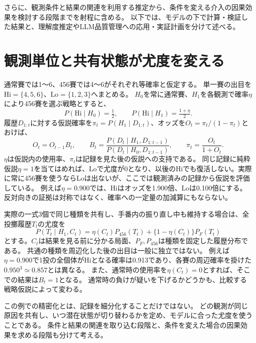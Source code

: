 \documentclass[10pt,a4paper]{article}
\newcommand{\given}{\mid}
\newcommand{\Hi}{\mathrm{Hi}}
\newcommand{\Lo}{\mathrm{Lo}}
\begin{document}
さらに、観測条件と結果の関連を利用する推定から、条件を変える介入の因果効果を検討する段階までを射程に含める。
以下では、モデルの下で計算・検証した結果と、理解度推定やLLM品質管理への応用・実証計画を分けて述べる。

\section{観測単位と共有状態が尤度を変える}
通常賽では1〜6、456賽では4〜6がそれぞれ等確率と仮定する。
単一賽の出目を$\Hi=\{4,5,6\}$、$\Lo=\{1,2,3\}$へまとめる。
$H_0$を常に通常賽、$H_1$を各観測で確率$\eta$により456賽を選ぶ戦略とすると、
\begin{equation}
 P(\Hi\given H_0)=\tfrac12,\qquad
 P(\Hi\given H_1)=\tfrac{1+\eta}{2}.
\end{equation}
履歴$D_{1:t}$に対する仮説確率を$\pi_t=P(H_1\given D_{1:t})$、オッズを$O_t=\pi_t/(1-\pi_t)$とおけば、
\begin{equation}
 O_t=O_{t-1}B_t,\qquad
 B_t=\frac{P(D_t\given H_1,D_{1:t-1})}{P(D_t\given H_0,D_{1:t-1})},\qquad
 \pi_t=\frac{O_t}{1+O_t}.
 \label{eq:odds}
\end{equation}
$\eta$は仮説内の使用率、$\pi_t$は記録を見た後の仮説への支持である。
同じ記録に純粋仮説$\eta=1$を当てはめれば、$\Lo$で尤度が0となり、以後の$\Hi$でも復活しない。実際に常に456賽を使うなら$\Lo$は出ないが、ここでは観測済みの記録から仮説を評価している。
例えば$\eta=0.900$では、$\Hi$はオッズを1.900倍、$\Lo$は0.100倍にする。
反対向きの証拠は対称ではなく、確率への一定量の加減算にもならない。

実際の一式3個で同じ種類を共有し、手番内の振り直し中も維持する場合は、全投擲履歴$T_t$の尤度を
\begin{equation}
 P(T_t\given H_1,C_t)
 =\eta(C_t)P_{456}(T_t)+\{1-\eta(C_t)\}P_F(T_t)
 \label{eq:shared}
\end{equation}
とする。$C_t$は結果を見る前に分かる局面、$P_F,P_{456}$は種類を固定した履歴分布である。
共通の種類を周辺化した後の出目は一般に独立ではない。
例えば$\eta=0.900$で1投の全個体が$\Hi$となる確率は0.913であり、各賽の周辺確率を掛けた$0.950^3\simeq0.857$とは異なる。
また、通常時の使用率を$\eta(C_t)=0$とすれば、そこでの結果は$B_t=1$となる。
通常時の負けが疑いを下げるかどうかも、比較する戦略仮説によって変わる。

この例での精密化とは、記録を細分化することだけではない。
どの観測が同じ原因を共有し、いつ潜在状態が切り替わるかを定め、モデルに合った尤度を使うことである。
条件と結果の関連を取り込む段階と、条件を変えた場合の因果効果を求める段階も分けて考える。
\end{document}
